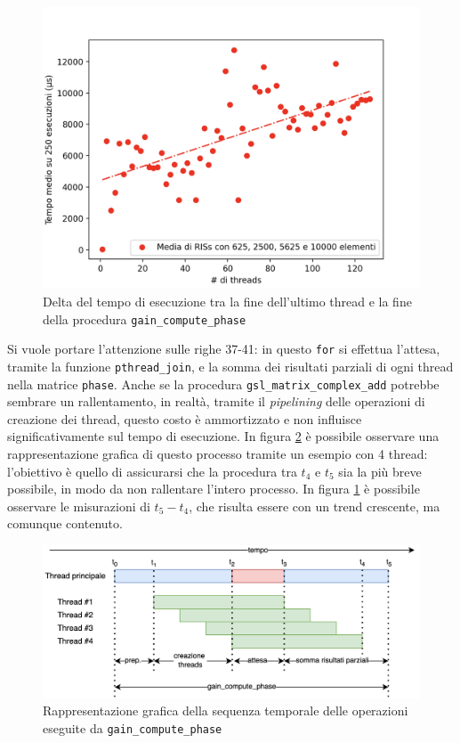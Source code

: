 \begin{figure}
  \centering
  \includegraphics[width=.6\textwidth]{images/results/gain-serial-time.png}
  \caption{Delta del tempo di esecuzione tra la fine dell'ultimo thread e la
  fine della procedura \texttt{gain\_compute\_phase}}
  \label{fig:serial-time}
\end{figure}

Si vuole portare l'attenzione sulle righe 37-41: in questo \texttt{for} si
effettua l'attesa, tramite la funzione \texttt{pthread\_join}, e la somma dei risultati
parziali di ogni thread nella matrice \texttt{phase}. Anche se la procedura \texttt{gsl\_matrix\_complex\_add}
potrebbe sembrare un rallentamento, in realtà, tramite il \textit{pipelining} delle
operazioni di creazione dei thread, questo costo è ammortizzato e non influisce
significativamente sul tempo di esecuzione. In figura \ref{fig:gain-compute-phase-pipeline}
è possibile osservare una rappresentazione grafica di questo processo tramite un
esempio con 4 thread: l'obiettivo è quello di assicurarsi che la procedura tra
$t_{4}$ e $t_{5}$ sia la più breve possibile, in modo da non rallentare l'intero
processo. In figura \ref{fig:serial-time} è possibile osservare le misurazioni
di $t_{5}- t_{4}$, che risulta essere con un trend crescente, ma comunque
contenuto.

\begin{figure}
  \centering
  \includegraphics[width=\textwidth]{
    images/examples/gain_compute_phase-pipeline.png
  }
  \caption{Rappresentazione grafica della sequenza temporale delle operazioni
  eseguite da \texttt{gain\_compute\_phase}}
  \label{fig:gain-compute-phase-pipeline}
\end{figure}

